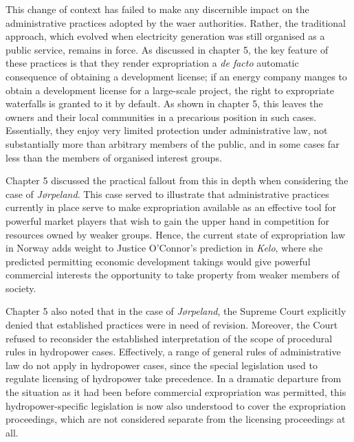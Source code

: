 This change of context has failed to make any discernible impact on the administrative practices adopted by the waer authorities. Rather, the traditional approach, which evolved when electricity generation was still organised as a public service, remains in force. As discussed in chapter 5, the key feature of these practices is that they render expropriation a {\it de facto} automatic consequence of obtaining a development license; if an energy company manges to obtain a development license for a large-scale project, the right to expropriate waterfalls is granted to it by default. As shown in chapter 5, this leaves the owners and their local communities in a precarious position in such cases. Essentially, they enjoy very limited protection under administrative law, not substantially more than arbitrary members of the public, and in some cases far less than the members of organised interest groups.


Chapter 5 discussed the practical fallout from this in depth when considering the case of {\it Jørpeland}. This case served to illustrate that administrative practices currently in place serve to make expropriation available as an effective tool for powerful market players that wish to gain the upper hand in competition for resources owned by weaker groups. Hence, the current state of expropriation law in Norway adds weight to Justice O'Connor's prediction in {\it Kelo}, where she predicted permitting economic development takings would give powerful commercial interests the opportunity to take property from weaker members of society.

Chapter 5 also noted that in the case of {\it Jørpeland}, the Supreme Court explicitly denied that established practices were in need of revision. Moreover, the Court refused to reconsider the established interpretation of the scope of procedural rules in hydropower cases. Effectively, a range of general rules of administrative law do not apply in hydropower cases, since the special legislation used to regulate licensing of hydropower take precedence. In a dramatic departure from the situation as it had been before commercial expropriation was permitted, this hydropower-specific legislation is now also understood to cover the expropriation proceedings, which are not considered separate from the licensing proceedings at all.

